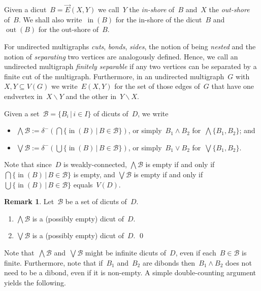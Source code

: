 \documentclass[reqno, 12pt]{amsart}
\numberwithin{equation}{section}
\numberwithin{figure}{section}
\let\setminus=\smallsetminus
\theoremstyle{plain}
\theoremstyle{definition}
\newtheorem{remark}[thm]{Remark}
\DeclareMathOperator{\insh}{in}
\DeclareMathOperator{\outsh}{out}
\begin{document}
Given a dicut~${B = \overrightarrow{E}(X, Y)}$ we call~$Y$ the \emph{in-shore} of~$B$ and~$X$ the \emph{out-shore} of~$B$.
We shall also write~$\insh(B)$ for the in-shore of the dicut~$B$ and~$\outsh(B)$ for the out-shore of~$B$.

For undirected multigraphs \emph{cuts}, \emph{bonds}, \emph{sides}, the notion of being \emph{nested} and the notion of \emph{separating} two vertices are analogously defined.
Hence, we call an undirected multigraph \emph{finitely separable} if any two vertices can be separated by a finite cut of the multigraph.
Furthermore, in an undirected multigraph~$G$ with~${X, Y \subseteq V(G)}$ we write~${E(X, Y)}$ for the set of those edges of~$G$ that have one endvertex in~${X \setminus Y}$ and the other in~${Y \setminus X}$.

\vspace{0.2cm}

Given a set~${\mathcal{B} = \{ B_i \, | \, i \in I\}}$ of dicuts of~$D$, we write
\begin{itemize}
    \item ${\bigwedge \mathcal{B} := \delta^{-} \left( \bigcap \{ \insh(B) \, | \, B \in \mathcal{B} \} \right)}$, 
        or simply~${B_1 \wedge B_2}$ for~${\bigwedge \{ B_1, B_2 \}}$; and
    \item ${\bigvee \mathcal{B} := \delta^{-} \left( \bigcup \{ \insh(B) \, | \, B \in \mathcal{B} \} \right)}$, 
        or simply~${B_1 \vee B_2}$ for~${\bigvee \{ B_1, B_2 \}}$.
\end{itemize}

Note that since~$D$ is weakly-connected, 
${\bigwedge \mathcal{B}}$ is empty if and only if~${\bigcap \{ \insh(B) \, | \, B \in \mathcal{B} \}}$ is empty, and 
${\bigvee \mathcal{B}}$ is empty if and only if~${\bigcup \{ \insh(B) \, | \, B \in \mathcal{B} \}}$ equals~$V(D)$. 

\begin{remark}
    \label{rem:corners1}
    Let~${\mathcal{B}}$ be a set of dicuts of~$D$.
    \begin{enumerate}
        \item ${\bigwedge \mathcal{B}}$ is a (possibly empty) dicut of~$D$.
        \item ${\bigvee \mathcal{B}}$ is a (possibly empty) dicut of~$D$. \qed
    \end{enumerate}
\end{remark}

Note that~${\bigwedge \mathcal{B}}$ and~${\bigvee \mathcal{B}}$ might be infinite dicuts of~$D$, even if each~${B \in \mathcal{B}}$ is finite. 
Furthermore, note that if~$B_1$ and~$B_2$ are dibonds then~${B_1 \wedge B_2}$ does not need to be a dibond, even if it is non-empty. 
A simple double-counting argument yields the following. 
\end{document}

